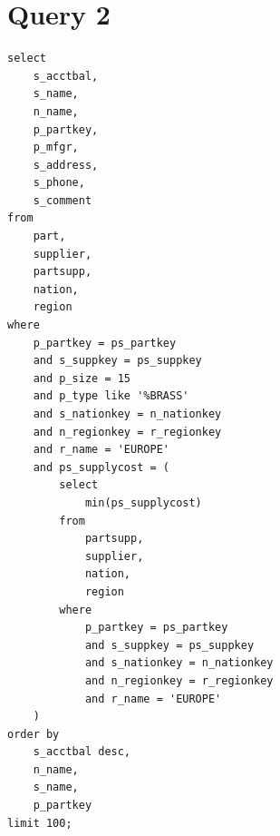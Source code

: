 \documentclass[a4paper,12pt]{scrreprt}
\begin{document}
\section{Query 2}\label{subsec:query2}

\begin{lstlisting}
select
    s_acctbal,
    s_name,
    n_name,
    p_partkey,
    p_mfgr,
    s_address,
    s_phone,
    s_comment
from
    part,
    supplier,
    partsupp,
    nation,
    region
where
    p_partkey = ps_partkey
    and s_suppkey = ps_suppkey
    and p_size = 15
    and p_type like '%BRASS'
    and s_nationkey = n_nationkey
    and n_regionkey = r_regionkey
    and r_name = 'EUROPE'
    and ps_supplycost = (
        select
            min(ps_supplycost)
        from
            partsupp,
            supplier,
            nation,
            region
        where
            p_partkey = ps_partkey
            and s_suppkey = ps_suppkey
            and s_nationkey = n_nationkey
            and n_regionkey = r_regionkey
            and r_name = 'EUROPE'
    )
order by
    s_acctbal desc,
    n_name,
    s_name,
    p_partkey
limit 100;
\end{lstlisting}
\end{document}

